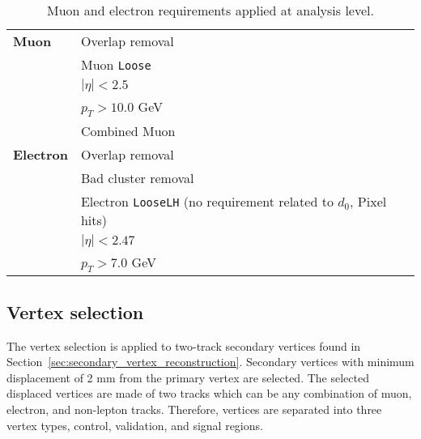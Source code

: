 \begin{table}[!htb]
  \centering
  \begin{tabular}{ l  l }
    \hline
    \hline
    \textbf{Muon}     &       Overlap removal                                                             \\
                                  &       Muon \texttt{Loose}                                                         \\
                                  &       $|\eta| < 2.5$                                                           \\
                                  &       $p_{T} > 10.0$ GeV                                                       \\
                                  &       Combined Muon                                                            \\
    \hline
    \textbf{Electron} &       Overlap removal                                                             \\
                                  &       Bad cluster removal                                                         \\
                                  &       Electron \texttt{LooseLH} (no requirement related to $d_{0}$, Pixel hits)   \\
                                  &       $|\eta| < 2.47$                                                             \\
                                  &       $p_{T} > 7.0$ GeV                                                           \\
    \hline
    \hline
  \end{tabular}
  \caption{Muon and electron requirements applied at analysis level.}
  \label{table:lepton_requirement}
\end{table}

\subsection{Vertex selection}
\label{sec:vertex_selection}
The vertex selection is applied to two-track secondary vertices found in Section~\ref{sec:secondary_vertex_reconstruction}. Secondary vertices with minimum displacement of 2 mm from the primary vertex are selected. The selected displaced vertices are made of two tracks which can be any combination of muon, electron, and non-lepton tracks. Therefore, vertices are separated into three vertex types, control, validation, and signal regions.

